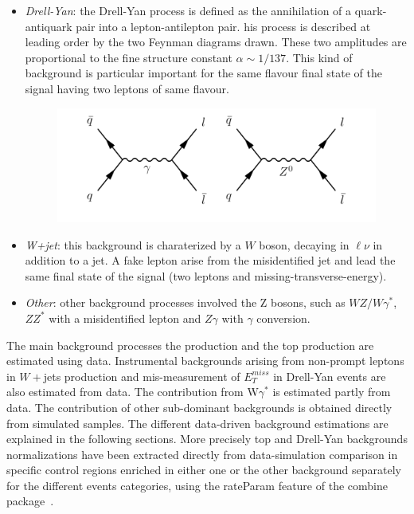 \begin{itemize}
\begin{figure}
\end{figure}
\item \textit{Drell-Yan}: the Drell-Yan process is defined as the annihilation of a quark-antiquark pair into a lepton-antilepton pair. his process is described at leading order by
the two Feynman diagrams drawn. These two amplitudes are proportional to the fine structure constant $\alpha \sim 1/137$.
This kind of background is particular important for the same flavour final state of the signal having two leptons  of same flavour.
\begin{figure}[h]
\centering
\vspace{0.5cm}
\includegraphics[scale= 0.7]{../Cap5/dy}
\end{figure}

\item \textit{W+jet}: this background is charaterized by a $W$ boson, decaying in $\ell \nu$ in addition to a jet. A fake lepton arise from the misidentified jet and lead the same final state of the signal (two leptons and missing-transverse-energy). 

\item \textit{Other}: other background processes involved the Z bosons, such as $WZ/W\gamma^*$, $ZZ^*$ with a misidentified lepton and $Z\gamma$ with $\gamma$ conversion.

\end{itemize}
The main background processes the \WW production and the top production  are estimated using data. 
Instrumental backgrounds arising from non-prompt leptons in $W+$jets production and mis-measurement of $E_T^{miss}$ in Drell-Yan events are also estimated from
data. The contribution from W$\gamma^*$  is estimated partly from data. The
contribution of other sub-dominant backgrounds is obtained directly from simulated samples. The different data-driven background estimations are explained in the following sections. More precisely top and  Drell-Yan backgrounds normalizations have been extracted
directly from data-simulation comparison in specific control regions enriched in either one
or the other background separately for the different events categories, using the rateParam feature of the combine package~\cite{combine}.


